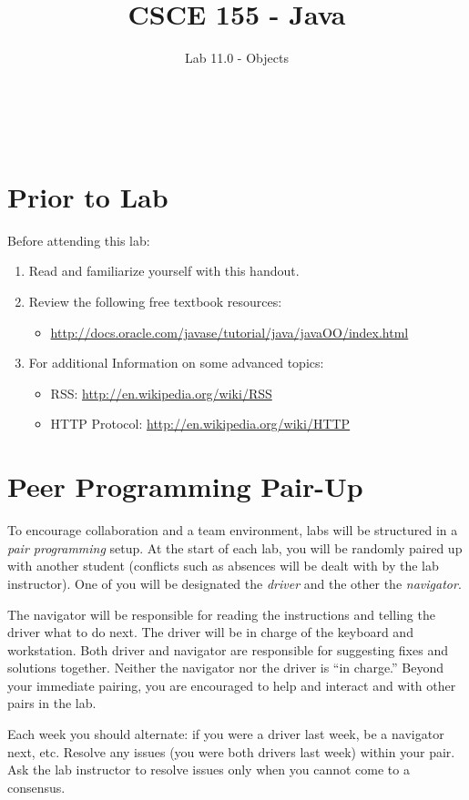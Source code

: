 \documentclass[12pt]{scrartcl}
\title{CSCE 155 - Java}
\subtitle{Lab 11.0 - Objects}
\author{~}
\date{~}
\begin{document}
\maketitle

\section*{Prior to Lab}

Before attending this lab:
\begin{enumerate}
  \item Read and familiarize yourself with this handout.
  \item Review the following free textbook resources:
	\begin{itemize}
  	  \item \url{http://docs.oracle.com/javase/tutorial/java/javaOO/index.html}
	\end{itemize}
  \item For additional Information on some advanced topics:
  \begin{itemize}
    \item RSS: \url{http://en.wikipedia.org/wiki/RSS}
    \item HTTP Protocol: \url{http://en.wikipedia.org/wiki/HTTP}
  \end{itemize}
\end{enumerate}

\section*{Peer Programming Pair-Up}

To encourage collaboration and a team environment, labs will be
structured in a \emph{pair programming} setup.  At the start of
each lab, you will be randomly paired up with another student 
(conflicts such as absences will be dealt with by the lab instructor).
One of you will be designated the \emph{driver} and the other
the \emph{navigator}.  

The navigator will be responsible for reading the instructions and
telling the driver what to do next.  The driver will be in charge of the
keyboard and workstation.  Both driver and navigator are responsible
for suggesting fixes and solutions together.  Neither the navigator
nor the driver is ``in charge.''  Beyond your immediate pairing, you
are encouraged to help and interact and with other pairs in the lab.

Each week you should alternate: if you were a driver last week, 
be a navigator next, etc.  Resolve any issues (you were both drivers
last week) within your pair.  Ask the lab instructor to resolve issues
only when you cannot come to a consensus.  
\end{document}
